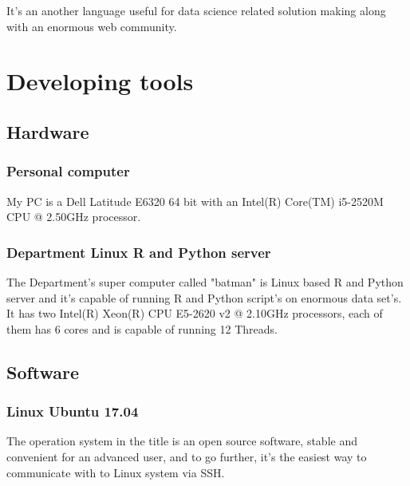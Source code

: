 It's an another language useful for data science related solution making along with an enormous web community.
	\section{Developing tools}
		\subsection{Hardware}
			\subsubsection{Personal computer}
My PC is a Dell Latitude E6320 64 bit with an Intel(R) Core(TM) i5-2520M CPU @ 2.50GHz processor.
\cite{Latitude}
			\subsubsection{Department Linux R and Python server}
The Department's super computer called "batman" is Linux based R and Python server and it's capable of running R and Python script's on enormous data set's. It has two Intel(R) Xeon(R) CPU E5-2620 v2 @ 2.10GHz processors, each of them has 6 cores and is capable of running 12 Threads.
\cite{Batman}
		\subsection{Software}
			\subsubsection{Linux Ubuntu 17.04}
The operation system in the title is an open source software, stable and convenient for an advanced user, and to go further, it's the easiest way to communicate with to Linux system via SSH.
\cite{Ubuntu}
